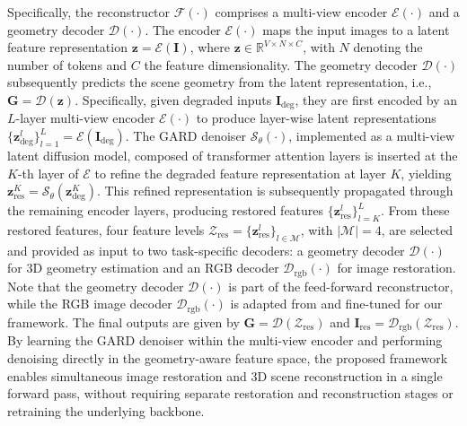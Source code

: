 \documentclass{llmxive}
\begin{document}
Specifically, the reconstructor $\mathcal{F}(\cdot)$ comprises a multi-view encoder $\mathcal{E}(\cdot)$ and a geometry decoder $\mathcal{D}(\cdot)$. The encoder $\mathcal{E}(\cdot)$ maps the input images to a latent feature representation $\mathbf{z} = \mathcal{E}(\mathbf{I})$, where $\mathbf{z} \in \mathbb{R}^{V \times N \times C}$, with $N$ denoting the number of tokens and $C$ the feature dimensionality. The geometry decoder $\mathcal{D}(\cdot)$ subsequently predicts the scene geometry from the latent representation, i.e., $\mathbf{G} = \mathcal{D}(\mathbf{z})$. Specifically, given degraded inputs $\mathbf{I}_{\text{deg}}$, they are first encoded by an $L$-layer multi-view encoder $\mathcal{E}(\cdot)$ to produce layer-wise latent representations $\{\mathbf{z}_{\text{deg}}^{l}\}_{l=1}^{L} = \mathcal{E}(\mathbf{I}_{\text{deg}})$. The GARD denoiser $\mathcal{S}_{\theta}(\cdot)$, implemented as a multi-view latent diffusion model, composed of transformer attention layers is inserted at the $K$-th layer of $\mathcal{E}$ to refine the degraded feature representation at layer $K$, yielding $\mathbf{z}_{\text{res}}^{K} = \mathcal{S}_{\theta}(\mathbf{z}_{\text{deg}}^{K})$. This refined representation is subsequently propagated through the remaining encoder layers, producing restored features $\{\mathbf{z}_{\text{res}}^{l}\}_{l=K}^{L}$. From these restored features, four feature levels $\mathcal{Z}_{\text{res}} = \{\mathbf{z}_{\text{res}}^{l}\}_{l \in \mathcal{M}}$, with $|\mathcal{M}| = 4$, are selected and provided as input to two task-specific decoders: a geometry decoder $\mathcal{D}(\cdot)$ for 3D geometry estimation and an RGB decoder $\mathcal{D}_{\text{rgb}}(\cdot)$ for image restoration. Note that the geometry decoder $\mathcal{D}(\cdot)$ is part of the feed-forward reconstructor, while the RGB image decoder $\mathcal{D}_{\text{rgb}}(\cdot)$ is adapted from \cite{jang2026gld} and fine-tuned for our framework. The final outputs are given by $\mathbf{G} = \mathcal{D}(\mathcal{Z}_{\text{res}})$ and $\mathbf{I}_{\text{res}} = \mathcal{D}_{\text{rgb}}(\mathcal{Z}_{\text{res}})$. By learning the GARD denoiser within the multi-view encoder and performing denoising directly in the geometry-aware feature space, the proposed framework enables simultaneous image restoration and 3D scene reconstruction in a single forward pass, without requiring separate restoration and reconstruction stages or retraining the underlying backbone.
\end{document}
